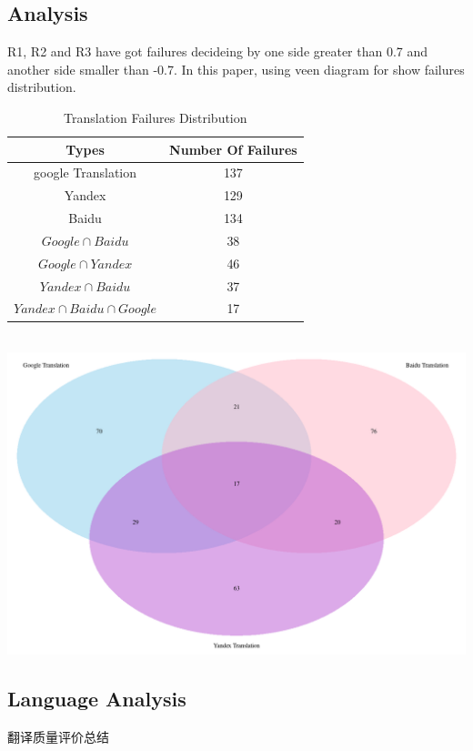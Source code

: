 \documentclass[conference]{IEEEtran}
\begin{document}
\begin{CJK*}{UTF8}{gbsn}
\subsection{Analysis}
R1, R2 and R3 have got failures decideing by one side greater than 0.7 and
another side smaller than -0.7. In this paper, using veen diagram for show
failures distribution.
  \begin{table}[h]
    \caption {Translation Failures Distribution}
    \begin{center}
      \begin{tabular}{|c|c|}
        \hline
        Types & Number Of Failures \\
        \hline\hline
        google Translation & 137\\
        \hline
        Yandex & 129 \\
        \hline
        Baidu & 134 \\
        \hline
        $Google \cap Baidu$ & 38 \\
        \hline
        $Google \cap Yandex$ & 46 \\
        \hline
        $Yandex \cap Baidu$ & 37 \\
        \hline
        $Yandex \cap Baidu \cap Google$ & 17 \\
        \hline
      \end{tabular}
    \end{center}
  \end{table}\\

\includegraphics[width=0.35\paperwidth]{./img/veen.png}

\subsection{Language Analysis}
翻译质量评价总结


\end{CJK*}
\end{document}
